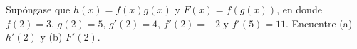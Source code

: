 \item Supóngase que $h(x) = f(x)g(x)$ y $F(x) = f(g(x))$, en donde $f(2) = 3$, $g(2) = 5$, $g'(2) = 4$, $f'(2) = -2$ y $f'(5) = 11$. Encuentre (a) $h'(2)$ y (b) $F'(2)$.
